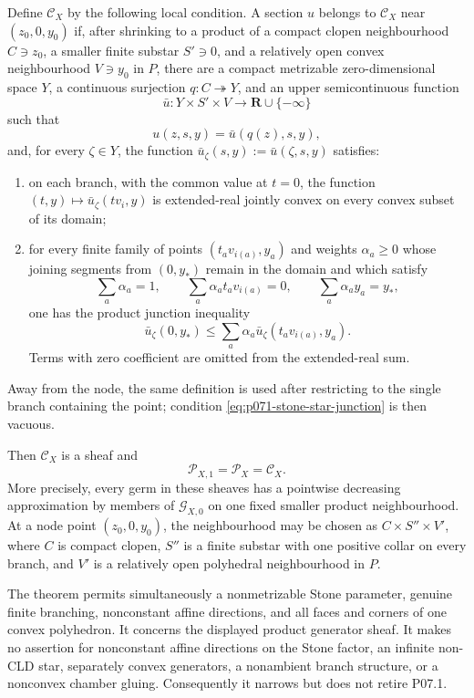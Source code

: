 \begin{theorem}
Define \(\mathcal C_X\) by the following local condition.  A section \(u\)
belongs to \(\mathcal C_X\) near \((z_0,0,y_0)\) if, after shrinking to a
product of a compact clopen neighbourhood \(C\ni z_0\), a smaller finite
substar \(S'\ni0\), and a relatively open convex neighbourhood
\(V\ni y_0\) in \(P\), there are a compact metrizable zero-dimensional
space \(Y\), a continuous surjection \(q:C\twoheadrightarrow Y\), and an
upper semicontinuous function
\[
        \bar u:Y\times S'\times V
             \longrightarrow\mathbf R\cup\{-\infty\}
\]
such that
\begin{equation}
 u(z,s,y)=\bar u(q(z),s,y),
 \label{eq:p071-stone-star-factorization}
\end{equation}
and, for every \(\zeta\in Y\), the function
\(\bar u_\zeta(s,y):=\bar u(\zeta,s,y)\) satisfies:
\begin{enumerate}
\item on each branch, with the common value at \(t=0\), the function
  \((t,y)\mapsto\bar u_\zeta(tv_i,y)\) is extended-real jointly convex on
  every convex subset of its domain;
\item for every finite family of points
  \((t_av_{i(a)},y_a)\) and weights \(\alpha_a\geq0\) whose joining
  segments from \((0,y_*)\) remain in the domain and which satisfy
  \[
    \sum_a\alpha_a=1,
    \qquad \sum_a\alpha_at_av_{i(a)}=0,
    \qquad \sum_a\alpha_ay_a=y_*,
  \]
  one has the product junction inequality
  \begin{equation}
     \bar u_\zeta(0,y_*)
        \leq\sum_a\alpha_a
                    \bar u_\zeta(t_av_{i(a)},y_a).
   \label{eq:p071-stone-star-junction}
  \end{equation}
  Terms with zero coefficient are omitted from the extended-real sum.
\end{enumerate}
Away from the node, the same definition is used after restricting to the
single branch containing the point; condition
\eqref{eq:p071-stone-star-junction} is then vacuous.

Then \(\mathcal C_X\) is a sheaf and
\begin{equation}
                 \mathcal P_{X,1}=\mathcal P_X=\mathcal C_X.
 \label{eq:p071-stone-star-collapse}
\end{equation}
More precisely, every germ in these sheaves has a pointwise decreasing
approximation by members of \(\mathcal G_{X,0}\) on one fixed smaller
product neighbourhood.  At a node point \((z_0,0,y_0)\), the neighbourhood
may be chosen as \(C\times S''\times V'\), where \(C\) is compact clopen,
\(S''\) is a finite substar with one positive collar on every branch, and
\(V'\) is a relatively open polyhedral neighbourhood in \(P\).

The theorem permits simultaneously a nonmetrizable Stone parameter,
genuine finite branching, nonconstant affine directions, and all faces and
corners of one convex polyhedron.  It concerns the displayed product
generator sheaf.  It makes no assertion for nonconstant affine directions
on the Stone factor, an infinite non-CLD star, separately convex
generators, a nonambient branch structure, or a nonconvex chamber gluing.
Consequently it narrows but does not retire P07.1.
\end{theorem}
